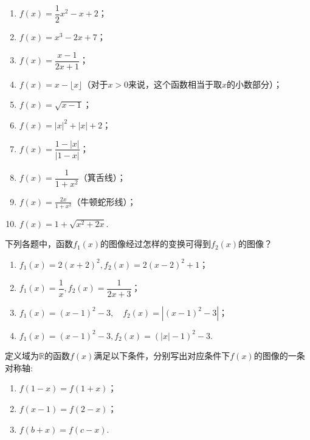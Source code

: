 \documentclass[lang=cn,math=cm,chinesefont=nofont,11pt,scheme=chinese,onecol]{elegantbook}
\begin{document}
\begin{spacing}{1.8}
  \begin{enumerate}\label{exer:FunctionGraph}
    \item $f(x)=\dfrac12 x^2-x+2$；
    \item $f(x)=x^3-2x+7$；
    \item $f(x)=\dfrac{x-1}{2x+1}$；
    \item $f(x)=x-\lfloor x\rfloor$（对于$x>0$来说，这个函数相当于取$x$的小数部分）；
    \item $f(x)=\sqrt{x-1}$；
    \item $f(x)=\left|x\right|^2+\left|x\right|+2$；
    \item $f(x)=\dfrac{1-\left|x\right|}{\left|1-x\right|}$；
    \item $f(x)=\dfrac{1}{1+x^2}$（箕舌线）；
    \item $f(x)=\frac{2x}{1+x^2}$（牛顿蛇形线）；
    \item $f(x)=1+\sqrt{x^{2}+2x}$.
  \end{enumerate}
\end{spacing}

\begin{exercise}\label{BJSZ.Algebra1.P58-59.changed}
  下列各题中，函数$f_1(x)$的图像经过怎样的变换可得到$f_2(x)$的图像？
\end{exercise}

\begin{spacing}{1.7}
  \begin{enumerate}
    \item $f_{1}(x)=2(x+2)^{2}, f_{2}(x)=2(x-2)^{2}+1$；
    \item $f_{1}(x)=\dfrac{1}{x}, f_{2}(x)=\dfrac{1}{2x+3}$；
    \item $f_{1}\left(x\right)=\left(x-1\right)^{2}-3,\quad f_{2}\left(x\right)=\left|\left(x-1\right)^{2}-3\right|$；
    \item $f_{1}(x)=(x-1)^{2}-3,f_{2}(x)=(|x|-1)^{2}-3$.
  \end{enumerate}
\end{spacing}

\begin{exercise}
  定义域为$\mathbb{R}$的函数$f(x)$满足以下条件，分别写出对应条件下$f(x)$的图像的一条对称轴:
\end{exercise}

\begin{enumerate}
  \item $f(1-x)=f(1+x)$；
  \item $f(x-1)=f(2-x)$；
  \item $f(b+x)=f(c-x)$.
\end{enumerate}
\end{document}
